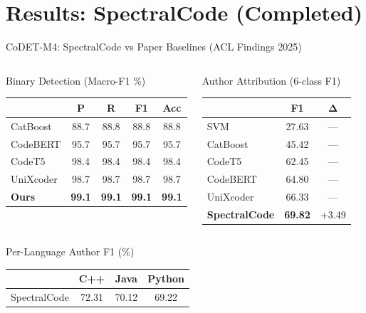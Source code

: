 \documentclass[aspectratio=169, 10pt]{beamer}
\begin{document}
\section{Results: SpectralCode (Completed)}

\begin{frame}{CoDET-M4: SpectralCode vs Paper Baselines (ACL Findings 2025)}
\vspace{-0.2cm}
\begin{columns}[T]
\begin{block}{Binary Detection (Macro-F1 \%)}
\centering\footnotesize
\begin{tabular}{lcccc}
\toprule
& \textbf{P} & \textbf{R} & \textbf{F1} & \textbf{Acc} \\
\midrule
CatBoost & 88.7 & 88.8 & 88.8 & 88.8 \\
CodeBERT & 95.7 & 95.7 & 95.7 & 95.7 \\
CodeT5 & 98.4 & 98.4 & 98.4 & 98.4 \\
UniXcoder & 98.7 & 98.7 & 98.7 & 98.7 \\
\midrule
\rowcolor{oursgreen}
\textbf{Ours} & \textbf{99.1} & \textbf{99.1} & \textbf{99.1} & \textbf{99.1} \\
\bottomrule
\end{tabular}
\end{block}

\begin{alertblock}{Author Attribution (6-class F1)}
\centering\footnotesize
\begin{tabular}{lc|c}
\toprule
& \textbf{F1} & $\boldsymbol{\Delta}$ \\
\midrule
SVM & 27.63 & --- \\
CatBoost & 45.42 & --- \\
CodeT5 & 62.45 & --- \\
CodeBERT & 64.80 & --- \\
UniXcoder & 66.33 & --- \\
\midrule
\rowcolor{oursgreen}
\textbf{SpectralCode} & \textbf{69.82} & \textcolor{softgreen}{+3.49} \\
\bottomrule
\end{tabular}
\end{alertblock}
\end{columns}

\vspace{0.1cm}
\begin{columns}[T]
\begin{block}{Per-Language Author F1 (\%)}
\centering\footnotesize
\begin{tabular}{lccc}
\toprule
& \textbf{C++} & \textbf{Java} & \textbf{Python} \\
\midrule
SpectralCode & 72.31 & 70.12 & 69.22 \\
\bottomrule
\end{tabular}
\end{block}


\end{columns}
\end{frame}
\end{document}
